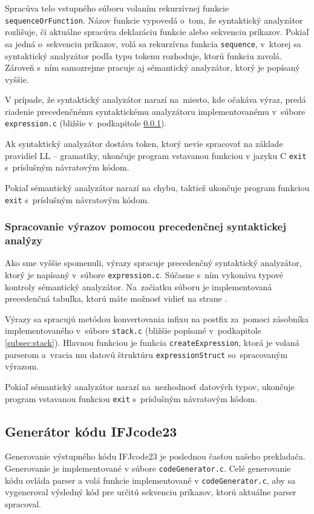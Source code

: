 \documentclass[a4paper, 11pt]{article}
\begin{document}
Spracúva telo vstupného súboru volaním rekurzívnej funkcie \texttt{sequenceOrFunction}. Názov funkcie
vypovedá o~tom, že syntaktický analyzátor rozlišuje, či aktuálne spracúva deklaráciu funkcie alebo
sekvenciu príkazov. Pokiaľ sa jedná o~sekvenciu príkazov, volá sa rekurzívna funkcia \texttt{sequence}, v~ktorej
sa syntaktický analyzátor podľa typu tokenu rozhoduje, ktorú funkciu zavolá. Zároveň s~ním samozrejme
pracuje aj sémantický analyzátor, ktorý je popísaný vyššie.

V prípade, že syntaktický analyzátor narazí na~miesto, kde očakáva výraz, predá riadenie precedenčnému syntaktickému analyzátoru implementovanému v~súbore \texttt{expression.c} (bližšie v~podkapitole \ref{subsec:sprac_v}).

Ak syntaktický analyzátor dostáva token, ktorý nevie spracovať na základe pravidiel LL -- gramatiky, ukončuje program vstavanou funkciou v jazyku C \texttt{exit} s~príslušným návratovým kódom.

Pokiaľ sémantický analyzátor narazí na chybu, taktiež ukončuje program funkciou \texttt{exit} s~príslušným návratovým kódom.

\subsubsection{Spracovanie výrazov pomocou precedenčnej syntaktickej analýzy}
\label{subsec:sprac_v}
Ako sme vyššie spomenuli, výrazy spracuje precedenčný syntaktický analyzátor, ktorý je napísaný v~súbore \texttt{expression.c}. Súčasne s~ním vykonáva typové kontroly sémantický analyzátor. Na~začiatku súboru je implementovaná precedenčná tabuľka, ktorú máte možnosť vidieť na strane \pageref{figure:preced_tab}.

Výrazy sa spracujú metódou konvertovania infixu na postfix za~pomoci zásobníka implementovaného v~súbore \texttt{stack.c} (bližšie popísané v~podkapitole \ref{subsec:stack}). Hlavnou funkciou je funkcia \texttt{createExpression}, ktorá
je volaná parserom a~vracia mu datovú štruktúru \texttt{expressionStruct} so~spracovaným výrazom.

Pokiaľ sémantický analyzátor narazí na~nezhodnosť datových typov, ukončuje program vstavanou funkciou \texttt{exit} s~príslušným návratovým kódom.

\subsection{Generátor kódu IFJcode23}
\label{subsec:gen}
Generovanie výstupného kódu IFJcode23 je poslednou časťou našeho prekladača. Generovanie je implementované v súbore \texttt{codeGenerator.c}. Celé generovanie kódu ovláda parser a volá funkcie implementované v \texttt{codeGenerator.c}, aby sa vygeneroval výsledný kód pre určitú sekvenciu príkazov, ktorú aktuálne parser spracoval. 
\end{document}
